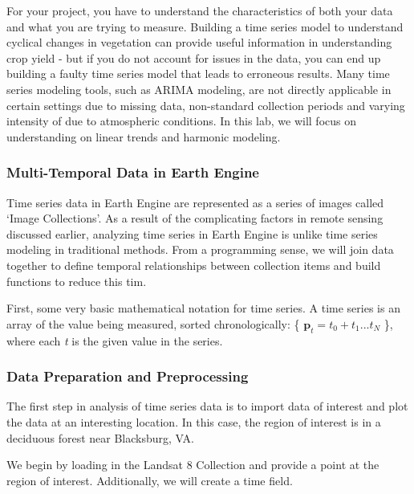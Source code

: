 \documentclass[
]{article}
\begin{document}
For your project, you have to understand the characteristics of both your data and what you are trying to measure. Building a time series model to understand cyclical changes in vegetation can provide useful information in understanding crop yield - but if you do not account for issues in the data, you can end up building a faulty time series model that leads to erroneous results. Many time series modeling tools, such as ARIMA modeling, are not directly applicable in certain settings due to missing data, non-standard collection periods and varying intensity of due to atmospheric conditions. In this lab, we will focus on understanding on linear trends and harmonic modeling.

\hypertarget{multi-temporal-data-in-earth-engine}{%
\subsubsection{Multi-Temporal Data in Earth Engine}\label{multi-temporal-data-in-earth-engine}}

Time series data in Earth Engine are represented as a series of images called `Image Collections'. As a result of the complicating factors in remote sensing discussed earlier, analyzing time series in Earth Engine is unlike time series modeling in traditional methods. From a programming sense, we will join data together to define temporal relationships between collection items and build functions to reduce this tim.

First, some very basic mathematical notation for time series. A time series is an array of the value being measured, sorted chronologically: \{ \(\textbf{p}_{t} = t_{0} + t_{1}... t_{N}\) \}, where each \emph{t} is the given value in the series.

\hypertarget{data-preparation-and-preprocessing}{%
\subsubsection{Data Preparation and Preprocessing}\label{data-preparation-and-preprocessing}}

The first step in analysis of time series data is to import data of interest and plot the data at an interesting location. In this case, the region of interest is in a deciduous forest near Blacksburg, VA.

We begin by loading in the Landsat 8 Collection and provide a point at the region of interest. Additionally, we will create a time field.
\end{document}
